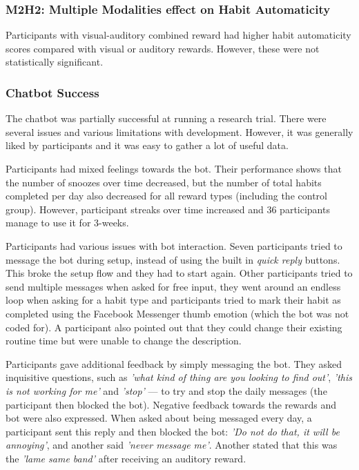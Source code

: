\subsubsection*{M2H2: Multiple Modalities effect on Habit Automaticity}
Participants with visual-auditory combined reward had higher habit automaticity scores compared with visual or auditory rewards. However, these were not statistically significant.


\subsubsection{Chatbot Success}
The chatbot was partially successful at running a research trial. There were several issues and various limitations with development. However, it was generally liked by participants and it was easy to gather a lot of useful data.

Participants had mixed feelings towards the bot. Their performance shows that the number of snoozes over time decreased, but the number of total habits completed per day also decreased for all reward types (including the control group). However, participant streaks over time increased and 36 participants manage to use it for 3-weeks.

Participants had various issues with bot interaction. Seven participants tried to message the bot during setup, instead of using the built in \textit{quick reply} buttons. This broke the setup flow and they had to start again. Other participants tried to send multiple messages when asked for free input, they went around an endless loop when asking for a habit type and participants tried to mark their habit as completed using the Facebook Messenger thumb emotion (which the bot was not coded for). A participant also pointed out that they could change their existing routine time but were unable to change the description.

Participants gave additional feedback by simply messaging the bot. They asked inquisitive questions, such as \textit{'what kind of thing are you looking to find out'}, \textit{'this is not working for me'} and \textit{'stop'} --- to try and stop the daily messages (the participant then blocked the bot). Negative feedback towards the rewards and bot were also expressed. When asked about being messaged every day, a participant sent this reply and then blocked the bot: \textit{'Do not do that, it will be annoying'}, and another said \textit{'never message me'}. Another stated that this was the \textit{'lame same band'} after receiving an auditory reward.

